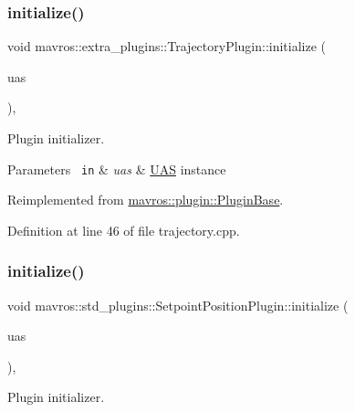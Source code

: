\subsubsection{\texorpdfstring{initialize()}{initialize()}\hspace{0.1cm}{\footnotesize\ttfamily [28/41]}}
{\footnotesize\ttfamily void mavros\+::extra\+\_\+plugins\+::\+Trajectory\+Plugin\+::initialize (\begin{DoxyParamCaption}\item[{\mbox{\hyperlink{classmavros_1_1UAS}{U\+AS}} \&}]{uas }\end{DoxyParamCaption})\hspace{0.3cm}{\ttfamily [inline]}, {\ttfamily [virtual]}}



Plugin initializer. 


\begin{DoxyParams}[1]{Parameters}
\mbox{\texttt{ in}}  & {\em uas} & {\ttfamily \mbox{\hyperlink{classmavros_1_1UAS}{U\+AS}}} instance \\
\hline
\end{DoxyParams}


Reimplemented from \mbox{\hyperlink{group__plugin_gad5313a41da4d26acbbabf008cdc21e82}{mavros\+::plugin\+::\+Plugin\+Base}}.



Definition at line 46 of file trajectory.\+cpp.

\mbox{\label{group__plugin_ga2bc831f4a3bdab8f284ead3bbc761181}} 
\subsubsection{\texorpdfstring{initialize()}{initialize()}\hspace{0.1cm}{\footnotesize\ttfamily [29/41]}}
{\footnotesize\ttfamily void mavros\+::std\+\_\+plugins\+::\+Setpoint\+Position\+Plugin\+::initialize (\begin{DoxyParamCaption}\item[{\mbox{\hyperlink{classmavros_1_1UAS}{U\+AS}} \&}]{uas }\end{DoxyParamCaption})\hspace{0.3cm}{\ttfamily [inline]}, {\ttfamily [virtual]}}



Plugin initializer. 


